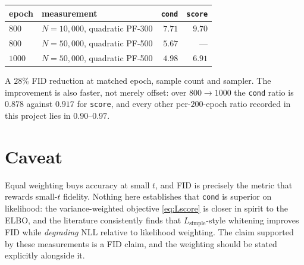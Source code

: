 \documentclass[11pt]{article}
\begin{document}
\begin{center}
\begin{tabular}{llrr}
\toprule
epoch & measurement & \texttt{cond} & \texttt{score}\\
\midrule
$800$  & $N=10{,}000$, quadratic PF-300 & $\mathbf{7.71}$ & $9.70$\\
$800$  & $N=50{,}000$, quadratic PF-500 & $\mathbf{5.67}$ & ---\\
$1000$ & $N=50{,}000$, quadratic PF-500 & $\mathbf{4.98}$ & $6.91$\\
\bottomrule
\end{tabular}
\end{center}

\noindent
A $28\%$ FID reduction at matched epoch, sample count and sampler. The improvement is
also faster, not merely offset: over $800\to1000$ the \texttt{cond} ratio is $0.878$
against $0.917$ for \texttt{score}, and every other per-$200$-epoch ratio recorded in this
project lies in $0.90$--$0.97$.

\section{Caveat}

Equal weighting buys accuracy at small $t$, and FID is precisely the metric that rewards
small-$t$ fidelity. Nothing here establishes that \texttt{cond} is superior on likelihood:
the variance-weighted objective \eqref{eq:Lscore} is closer in spirit to the ELBO, and the
literature consistently finds that $L_{\text{simple}}$-style whitening improves FID while
\emph{degrading} NLL relative to likelihood weighting. The claim supported by these
measurements is a FID claim, and the weighting should be stated explicitly alongside it.
\end{document}
